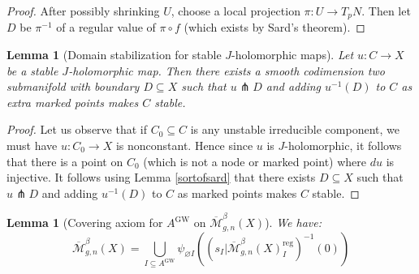 \documentclass[12pt]{article}
\newtheorem{lemma}[theorem]{Lemma}
\theoremstyle{definition}
\theoremstyle{remark}
\numberwithin{equation}{subsection}
\newcommand{\Mbar}{\overline{\mathcal M}}
\newcommand{\GW}{\mathrm{GW}}
\newcommand{\reg}{\mathrm{reg}}
\begin{document}
\begin{proof}
After possibly shrinking $U$, choose a local projection $\pi:U\to T_pN$.  Then let $D$ be $\pi^{-1}$ of a regular value of $\pi\circ f$ (which exists by Sard's theorem).
\end{proof}

\begin{lemma}[Domain stabilization for stable $J$-holomorphic maps]\label{stabilizationlemma}
Let $u:C\to X$ be a stable $J$-holomorphic map.  Then there exists a smooth codimension two submanifold with boundary $D\subseteq X$ such that $u\pitchfork D$ and adding $u^{-1}(D)$ to $C$ as extra marked points makes $C$ stable.
\end{lemma}

\begin{proof}
Let us observe that if $C_0\subseteq C$ is any unstable irreducible component, we must have $u:C_0\to X$ is nonconstant.  Hence since $u$ is $J$-holomorphic, it follows that there is a point on $C_0$ (which is not a node or marked point) where $du$ is injective.  It follows using Lemma \ref{sortofsard} that there exists $D\subseteq X$ such that $u\pitchfork D$ and adding $u^{-1}(D)$ to $C$ as marked points makes $C$ stable.
\end{proof}

\begin{lemma}[Covering axiom for $A^\GW$ on $\Mbar_{g,n}^\beta(X)$]\label{everythingcanbethickened}
We have:
\begin{equation}
\Mbar_{g,n}^\beta(X)=\bigcup_{I\subseteq A^\GW}\psi_{\varnothing I}((s_I|\Mbar_{g,n}^\beta(X)_I^\reg)^{-1}(0))
\end{equation}
\end{lemma}
\end{document}
